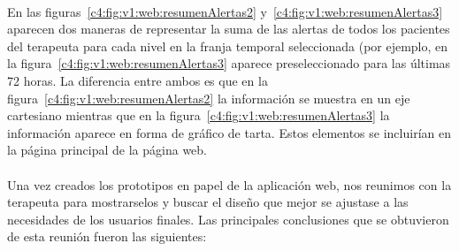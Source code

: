 \paragraph{}
En las figuras~\ref{c4:fig:v1:web:resumenAlertas2} y~\ref{c4:fig:v1:web:resumenAlertas3} aparecen dos maneras de representar la suma de las alertas de todos los pacientes del terapeuta para cada nivel en la franja temporal seleccionada (por ejemplo, en la figura~\ref{c4:fig:v1:web:resumenAlertas3} aparece preseleccionado para las últimas 72 horas. La diferencia entre ambos es que en la figura~\ref{c4:fig:v1:web:resumenAlertas2} la información se muestra en un eje cartesiano mientras que en la figura~\ref{c4:fig:v1:web:resumenAlertas3} la información aparece en forma de gráfico de tarta. Estos elementos se incluirían en la página principal de la página web.

\paragraph{}
Una vez creados los prototipos en papel de la aplicación web, nos reunimos con la terapeuta para mostrarselos y buscar el diseño que mejor se ajustase a las necesidades de los usuarios finales. Las principales conclusiones que se obtuvieron de esta reunión fueron las siguientes:

